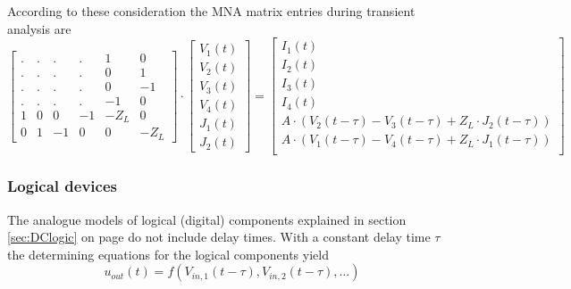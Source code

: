 According to these consideration the MNA matrix entries during
transient analysis are
\begin{equation}
\begin{bmatrix}
. & . & . & . & 1 & 0\\
. & . & . & . & 0 & 1\\
. & . & . & . & 0 & -1\\
. & . & . & . & -1 & 0\\
1 & 0 & 0 & -1 & -Z_L & 0\\
0 & 1 & -1 & 0 & 0 & -Z_L
\end{bmatrix}
\cdot
\begin{bmatrix}
V_1\left(t\right)\\
V_2\left(t\right)\\
V_3\left(t\right)\\
V_4\left(t\right)\\
J_1\left(t\right)\\
J_2\left(t\right)
\end{bmatrix}
=
\begin{bmatrix}
I_1\left(t\right)\\
I_2\left(t\right)\\
I_3\left(t\right)\\
I_4\left(t\right)\\
A\cdot\left(V_2\left(t -\tau\right) - V_3\left(t -\tau\right) + Z_L\cdot J_2\left(t -\tau\right)\right)\\
A\cdot\left(V_1\left(t -\tau\right) - V_4\left(t -\tau\right) + Z_L\cdot J_1\left(t -\tau\right)\right)\\
\end{bmatrix}
\end{equation}

\subsubsection{Logical devices}

The analogue models of logical (digital) components explained in
section \ref{sec:DClogic} on page \pageref{sec:DClogic} do not include
delay times.  With a constant delay time $\tau$ the determining
equations for the logical components yield
\begin{equation}
u_{out}\left(t\right) = f\left(V_{in,1}\left(t - \tau\right), V_{in,2}\left(t - \tau\right), \ldots\right)
\end{equation}


